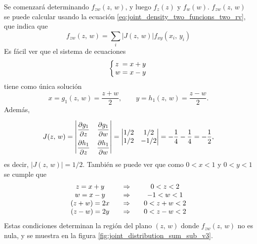 \documentclass[a4paper]{report}
\begin{document}
Se comenzará determinando \(f_{zw}(z,\,w)\), y luego \(f_z(z)\) y \(f_w(w)\). \(f_{zw}(z,\,w)\) se puede calcular usando la ecuación \ref{eq:joint_density_two_funcions_two_rv}, que indica que
\[
 f_{zw}(z,\,w)=\sum_{i}|J(z,\,w)|f_{xy}(x_i,\,y_i)
\]
Es fácil ver que el sistema de ecuaciones
\[
 \arraycolsep=1.4pt
 \left\{
 \begin{array}{lll}
  z&=&x+y\\
  w&=&x-y
 \end{array} \right.
\]
tiene como única solución
\[
 x=g_1(z,\,w)=\frac{z+w}{2},\qquad y=h_1(z,\,w)=\frac{z-w}{2}.
\]
Además,
\[
\def\arraystretch{2.2}
 J(z,\,w)=
 \begin{vmatrix}
    \dfrac{\partial g_1}{\partial z} & \dfrac{\partial g_1}{\partial w} \\
    \dfrac{\partial h_1}{\partial z} & \dfrac{\partial h_1}{\partial w}
\end{vmatrix}=
\def\arraystretch{1}
\begin{vmatrix}
   1/2 & 1/2 \\
   1/2 & -1/2
\end{vmatrix}
=-\frac{1}{4}-\frac{1}{4}=-\frac{1}{2},
\]
es decir, \(|J(z,\,w)|=1/2\). También se puede ver que como \(0<x<1\) y \(0<y<1\) se cumple que
\[
 \def\arraystretch{1}\arraycolsep=10pt
 \begin{array}{ccc}
  z=x+y&\Rightarrow&0<z<2\\
  w=x-y&\Rightarrow&-1<w<1\\
  (z+w)=2x&\Rightarrow&0<z+w<2\\
  (z-w)=2y&\Rightarrow&0<z-w<2
 \end{array}
\]
Estas condiciones determinan la región del plano \((z,\,w)\) donde \(f_{zw}(z,\,w)\) no es nula, y se muestra en la figura \ref{fig:joint_distribution_sum_sub_v3}.
\end{document}
